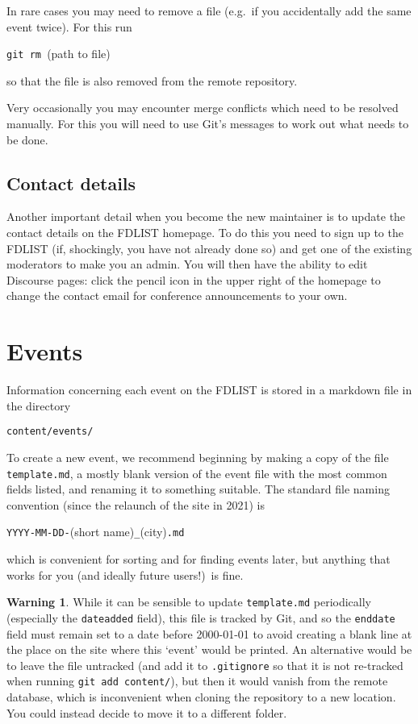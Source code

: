 \documentclass[12pt]{scrartcl}
\theoremstyle{definition}
\newtheorem*{warn}{Warning}
\begin{document}
In rare cases you may need to remove a file (e.g.\ if you accidentally add the same event twice). For this run
\begin{center}
\verb|git rm |(path to file)
\end{center}
so that the file is also removed from the remote repository.

Very occasionally you may encounter merge conflicts which need to be resolved manually.
For this you will need to use Git's messages to work out what needs to be done.

\subsection{Contact details}
Another important detail when you become the new maintainer is to update the contact details on the FDLIST homepage.
To do this you need to sign up to the FDLIST (if, shockingly, you have not already done so) and get one of the existing moderators to make you an admin.
You will then have the ability to edit Discourse pages: click the pencil icon in the upper right of the homepage to change the contact email for conference announcements to your own.

\section{Events}
Information concerning each event on the FDLIST is stored in a markdown file in the directory
\begin{center}
\verb|content/events/|
\end{center}
To create a new event, we recommend beginning by making a copy of the file \verb|template.md|, a mostly blank version of the event file with the most common fields listed, and renaming it to something suitable.
The standard file naming convention (since the relaunch of the site in 2021) is
\begin{center}
\verb|YYYY-MM-DD-|(short name)\verb|_|(city)\verb|.md|
\end{center}
which is convenient for sorting and for finding events later, but anything that works for you (and ideally future users!)\ is fine.

\begin{warn}
While it can be sensible to update \verb|template.md| periodically (especially the \verb|dateadded| field), this file is tracked by Git, and so the \verb|enddate| field must remain set to a date before 2000-01-01 to avoid creating a blank line at the place on the site where this `event' would be printed.
An alternative would be to leave the file untracked (and add it to \verb|.gitignore| so that it is not re-tracked when running \verb|git add content/|), but then it would vanish from the remote database, which is inconvenient when cloning the repository to a new location.
You could instead decide to move it to a different folder.
\end{warn}
\end{document}
